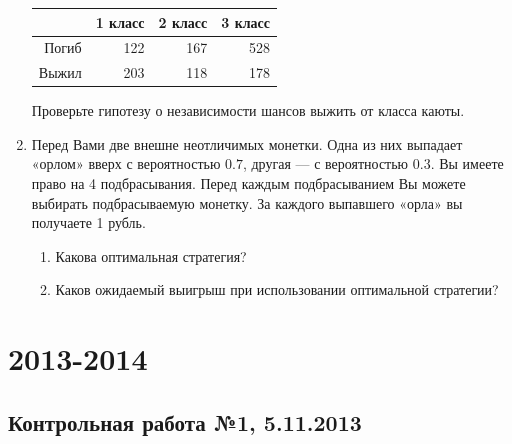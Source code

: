 \documentclass[12pt, a4paper]{article}\usepackage[]{graphicx}\usepackage[]{color}
\begin{document}
\begin{enumerate}
\begin{table}[ht]
\centering
\begin{tabular}{rrrr}
  \hline
 & 1 класс & 2 класс & 3 класс \\ 
  \hline
Погиб & 122 & 167 & 528 \\ 
  Выжил & 203 & 118 & 178 \\ 
   \hline
\end{tabular}
\end{table}


Проверьте гипотезу о независимости шансов выжить от класса каюты.

\item Перед Вами две внешне неотличимых монетки. Одна из них выпадает «орлом» вверх с вероятностью $0.7$, другая — с вероятностью $0.3$. Вы имеете право на 4 подбрасывания. Перед каждым подбрасыванием Вы можете выбирать подбрасываемую монетку. За каждого выпавшего «орла» вы получаете 1 рубль.
\begin{enumerate}
\item Какова оптимальная стратегия?
\item Каков ожидаемый выигрыш при использовании оптимальной стратегии?
\end{enumerate}

\end{enumerate}


\section{2013-2014}

\subsection{Контрольная работа №1, 5.11.2013}
\end{document}
